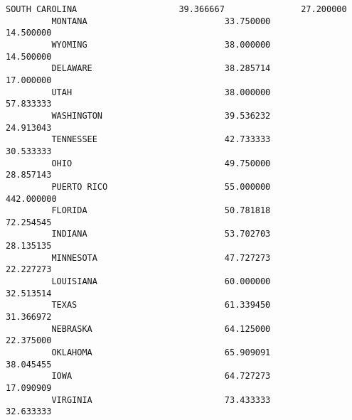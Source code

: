 \documentclass[11pt]{article}
\begin{document}
\begin{Verbatim}[commandchars=\\\{\}]
         SOUTH CAROLINA                    39.366667               27.200000   
         MONTANA                           33.750000               14.500000   
         WYOMING                           38.000000               14.500000   
         DELAWARE                          38.285714               17.000000   
         UTAH                              38.000000               57.833333   
         WASHINGTON                        39.536232               24.913043   
         TENNESSEE                         42.733333               30.533333   
         OHIO                              49.750000               28.857143   
         PUERTO RICO                       55.000000              442.000000   
         FLORIDA                           50.781818               72.254545   
         INDIANA                           53.702703               28.135135   
         MINNESOTA                         47.727273               22.227273   
         LOUISIANA                         60.000000               32.513514   
         TEXAS                             61.339450               31.366972   
         NEBRASKA                          64.125000               22.375000   
         OKLAHOMA                          65.909091               38.045455   
         IOWA                              64.727273               17.090909   
         VIRGINIA                          73.433333               32.633333   
         

\end{Verbatim}
\end{document}
